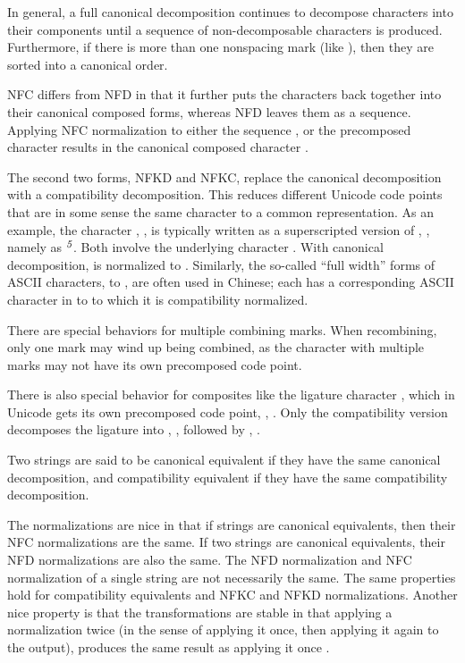 In general, a full canonical decomposition continues
to decompose characters into their components until a sequence of
non-decomposable characters is produced.  Furthermore, if there is
more than one nonspacing mark (like ), then they are
sorted into a canonical order.

NFC differs from NFD in that it further puts the characters back
together into their canonical composed forms, whereas NFD leaves them
as a sequence.  Applying NFC normalization to either the sequence
,  or the precomposed character
 results in the canonical composed character .

The second two forms, NFKD and NFKC, replace the canonical
decomposition with a compatibility decomposition.  This reduces
different Unicode code points that are in some sense the same
character to a common representation.  As an example, the character
, , is typically written
as a superscripted version of , ,
namely as ${}^{\mbox{\footnotesize\mbox{\it 5}}}$.
Both involve the underlying character .  With
canonical decomposition,  is normalized to .
Similarly, the so-called ``full width'' forms of ASCII characters, 
 to , are often used in Chinese; each
has a corresponding ASCII character in  to 
to which it is compatibility normalized.  

There are special behaviors for multiple combining marks.  When
recombining, only one mark may wind up being combined, as the
character with multiple marks may not have its own precomposed code
point.  

There is also special behavior for composites like the ligature
character , which in Unicode gets its own precomposed
code point, , .
Only the compatibility version decomposes the ligature into
, , followed by ,
.

Two strings are said to be canonical equivalent if they have
the same canonical decomposition, and compatibility equivalent
if they have the same compatibility decomposition.  

The normalizations are nice in that if strings are canonical
equivalents, then their NFC normalizations are the same.  If two
strings are canonical equivalents, their NFD normalizations are also
the same.  The NFD normalization and NFC normalization of a single
string are not necessarily the same.  The same properties hold for
compatibility equivalents and NFKC and NFKD normalizations.  Another
nice property is that the transformations are stable in that applying
a normalization twice (in the sense of applying it once, then applying
it again to the output), produces the same result as applying it
once . 

